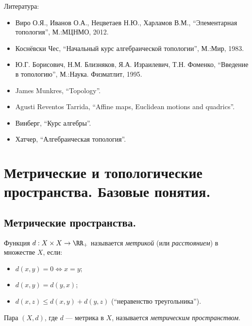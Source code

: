 \documentclass[12pt,a4paper]{article}
\date{}
\begin{document}
    \maketitle

    \listoftodos[TODOs]

    \tableofcontents

    \vspace{2em}

    Литература:
    \begin{itemize}
        \item Виро О.Я., Иванов О.А., Нецветаев Н.Ю., Харламов В.М., ``Элементарная топология'', М.:МЦНМО, 2012.
        \item Коснёвски Чес, ``Начальный курс алгебраической топологии'', М.:Мир, 1983.
        \item Ю.Г. Борисович, Н.М. Близняков, Я.А. Израилевич, Т.Н. Фоменко, ``Введение в топологию'', М.:Наука. Физматлит, 1995.
        \item James Munkres, ``Topology''.
        \item Agusti Reventos Tarrida, ``Affine maps, Euclidean motions and quadrics''.
        \item Винберг, ``Курс алгебры''.
        \item Хатчер, ``Алгебраическая топология''. 
    \end{itemize}

    \section{Метрические и топологические пространства. Базовые понятия.}
    
    \subsection{Метрические пространства.}

    \begin{definition}
        Функция $d: X \times X \to \RR_+$ называется \emph{метрикой} (или \emph{расстоянием}) в множестве $X$, если:
        \begin{itemize}
            \item $d(x, y) = 0 \Leftrightarrow x = y$;
            \item $d(x, y) = d(y, x)$;
            \item $d(x, z) \leqslant d(x, y) + d(y, z)$ (``неравенство треугольника'').
        \end{itemize}
        Пара $(X, d)$, где $d$ --- метрика в $X$, называется \emph{метрическим пространством}.
    \end{definition}
\end{document}
